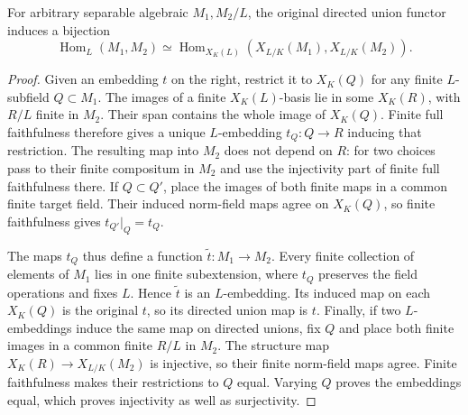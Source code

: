 \begin{lemma}
\label{fw:separable-algebraic-full-faithful}
\leanok
For arbitrary separable algebraic $M_1,M_2/L$, the original directed
union functor induces a bijection
\[
 \operatorname{Hom}_L(M_1,M_2)\simeq
 \operatorname{Hom}_{X_K(L)}(X_{L/K}(M_1),X_{L/K}(M_2)).
\]
\end{lemma}
\begin{proof}
Given an embedding $t$ on the right, restrict it to $X_K(Q)$ for
any finite $L$-subfield $Q\subset M_1$. The images of a finite
$X_K(L)$-basis lie in some $X_K(R)$, with $R/L$ finite in $M_2$.
Their span contains the whole image of $X_K(Q)$. Finite full
faithfulness therefore gives a unique $L$-embedding $t_Q:Q\to R$
inducing that restriction. The resulting map into $M_2$ does not
depend on $R$: for two choices pass to their finite compositum in
$M_2$ and use the injectivity part of finite full faithfulness there.
If $Q\subset Q'$, place the images of both finite maps in a common
finite target field. Their induced norm-field maps agree on $X_K(Q)$,
so finite faithfulness gives $t_{Q'}|_Q=t_Q$.

The maps $t_Q$ thus define a function $\widetilde t:M_1\to M_2$.
Every finite collection of elements of $M_1$ lies in one finite
subextension, where $t_Q$ preserves the field operations and fixes
$L$. Hence $\widetilde t$ is an $L$-embedding. Its induced map on
each $X_K(Q)$ is the original $t$, so its directed union map is $t$.
Finally, if two $L$-embeddings induce the same map on directed unions,
fix $Q$ and place both finite images in a common finite $R/L$ in
$M_2$. The structure map $X_K(R)\to X_{L/K}(M_2)$ is injective,
so their finite norm-field maps agree. Finite faithfulness makes
their restrictions to $Q$ equal. Varying $Q$ proves the embeddings
equal, which proves injectivity as well as surjectivity.
\end{proof}

